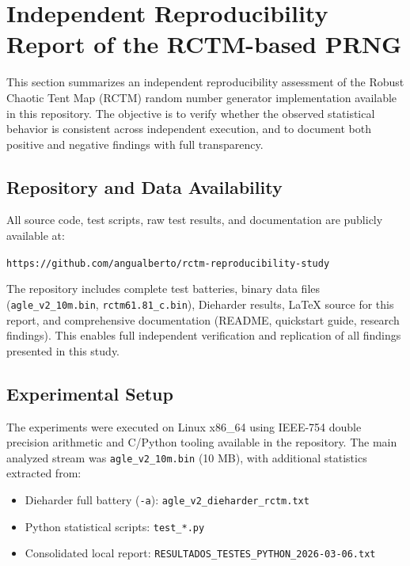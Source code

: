
\section{Independent Reproducibility Report of the RCTM-based PRNG}
\label{sec:repro_report}

This section summarizes an independent reproducibility assessment of the Robust Chaotic Tent Map (RCTM) random number generator implementation available in this repository. The objective is to verify whether the observed statistical behavior is consistent across independent execution, and to document both positive and negative findings with full transparency.

\subsection{Repository and Data Availability}

All source code, test scripts, raw test results, and documentation are publicly available at:

\texttt{https://github.com/angualberto/rctm-reproducibility-study}

The repository includes complete test batteries, binary data files (\texttt{agle\_v2\_10m.bin}, \texttt{rctm61.81\_c.bin}), Dieharder results, LaTeX source for this report, and comprehensive documentation (README, quickstart guide, research findings). This enables full independent verification and replication of all findings presented in this study.

\subsection{Experimental Setup}

The experiments were executed on Linux x86\_64 using IEEE-754 double precision arithmetic and C/Python tooling available in the repository. The main analyzed stream was \texttt{agle\_v2\_10m.bin} (10 MB), with additional statistics extracted from:

\begin{itemize}
\item Dieharder full battery (\texttt{-a}): \texttt{agle\_v2\_dieharder\_rctm.txt}
\item Python statistical scripts: \texttt{test\_*.py}
\item Consolidated local report: \texttt{RESULTADOS\_TESTES\_PYTHON\_2026-03-06.txt}
\end{itemize}

